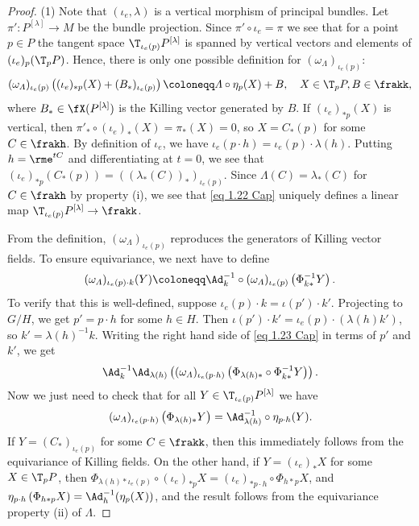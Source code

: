 \begin{proof}
    (1) Note that $(\iota_e,\lambda)$ is a vertical morphism of principal bundles. Let $\pi':P^{[\lambda]}\to M$ be the bundle projection. Since $\pi'\circ \iota_e=\pi$ we see that for a point $p\in P$ the tangent space $\T_{\iota_e(p)}P^{[\lambda]}$ is spanned by vertical vectors and elements of $(\iota_e)_p(\T_p P)$. Hence, there is only one possible definition for $(\omega_\varLambda)_{\iota_e(p)}$:
    \[(\omega_\varLambda)_{\iota_e(p)}\left((\iota_e)_{\ast p}(X)+(B_\ast)_{\iota_e(p)}\right)\coloneqq \varLambda\circ \eta_p (X)+B,\quad X\in \T_p P,B\in\frakk,\label{eq 1.22 Cap}\]
    where $B_\ast\in\fX(P^{[\lambda]})$ is the Killing vector generated by $B$.  If $(\iota_e)_{\ast p}(X)$ is vertical, then $\pi'_\ast\circ (\iota_e)_\ast (X)=\pi_\ast(X)=0$, so $X=C_\ast(p)$ for some $C\in\frakh$. By definition of $\iota_e$, we have $\iota_e(p\cdot h)=\iota_e(p)\cdot \lambda(h)$. Putting $h=\rme^{tC}$ and differentiating at $t=0$, we see that $(\iota_e)_{\ast p}(C_\ast(p))=\left((\lambda_\ast(C))_\ast\right)_{\iota_e(p)}$. Since $\varLambda(C)=\lambda_\ast(C)$ for $C\in\frakh$ by property (i), we see that \eqref{eq 1.22 Cap} uniquely defines a linear map $\T_{\iota_e(p)}P^{[\lambda]}\to\frakk$.

    From the definition, $(\omega_\varLambda)_{\iota_e(p)}$ reproduces the generators of Killing vector fields. To ensure equivariance, we next have to define 
    \[(\omega_\varLambda)_{\iota_e(p)\cdot k}(Y)\coloneqq \Ad_k^{-1}\circ (\omega_\varLambda)_{\iota_e(p)}\left(\Phi_{k\ast}^{-1} Y\right).\label{eq 1.23 Cap}\]
    To verify that this is well-defined, suppose $\iota_e(p)\cdot k=\iota(p')\cdot k'$. Projecting to $G\slash H$, we get $p'=p\cdot h$ for some $h\in H$. Then $\iota(p')\cdot k'=\iota_e(p)\cdot(\lambda(h)k')$, so $k'=\lambda(h)^{-1}k$. Writing the right hand side of \eqref{eq 1.23 Cap} in terms of $p'$ and $k'$, we get 
    \[\Ad_k^{-1}\Ad_{\lambda(h)}\left((\omega_\varLambda)_{\iota_e(p\cdot h)}\left(\Phi_{\lambda(h)\ast}\circ \Phi_{k\ast}^{-1}Y\right)\right).\] 
    Now we just need to check that for all $Y\in \T_{\iota_e(p)}P^{[\lambda]}$ we have 
    \[(\omega_\varLambda)_{\iota_e(p\cdot h)}\left(\Phi_{\lambda(h)\ast}Y\right)=\Ad_{\lambda(h)}^{-1}\circ \eta_{p\cdot h}(Y).\]
    If $Y=(C_\ast)_{\iota_e(p)}$ for some $C\in\frakk$, then this immediately follows from the equivariance of Killing fields. On the other hand, if $Y=(\iota_e)_\ast X$ for some $X\in \T_p P$, then $\Phi_{\lambda(h)\ast \iota_e(p)}\circ (\iota_e)_{\ast p}X=(\iota_e)_{\ast p\cdot h}\circ \Phi_{h\ast p}X$, and $\eta_{p\cdot h}\left(\Phi_{h\ast p}X\right)=\Ad_h^{-1}(\eta_p(X))$, and the result follows from the equivariance property (ii) of $\varLambda$.


\end{proof}
